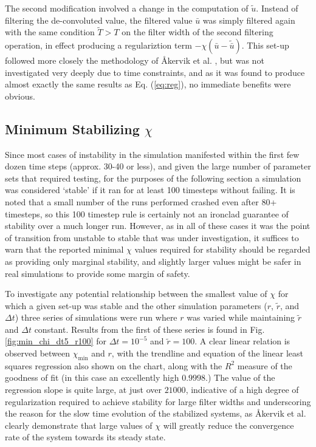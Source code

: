 The second modification involved a change in the computation of $\tilde{u}$. Instead of filtering the de-convoluted value, the filtered value $\bar{u}$ was simply filtered again with the same condition $\tilde{T}>T$ on the filter width of the second filtering operation, in effect producing a regulariztion term $-\chi(\bar{u}-\tilde{\bar{u}})$. This set-up followed more closely the methodology of \AA kervik et al. \cite{Akervik2006}, but was not investigated very deeply due to time constraints, and as it was found to produce almost exactly the same results as Eq. (\ref{eq:reg}), no immediate benefits were obvious.

\subsection{Minimum Stabilizing $\chi$}

Since most cases of instability in the simulation manifested within the first few dozen time steps (approx. 30-40 or less), and given the large number of parameter sets that required testing, for the purposes of the following section a simulation was considered `stable' if it ran for at least 100 timesteps without failing. It is noted that a small number of the runs performed crashed even after 80+ timesteps, so this 100 timestep rule is certainly not an ironclad guarantee of stability over a much longer run. However, as in all of these cases it was the point of transition from unstable to stable that was under investigation, it suffices to warn that the reported minimal $\chi$ values required for stability should be regarded as providing only marginal stability, and slightly larger values might be safer in real simulations to provide some margin of safety.

To investigate any potential relationship between the smallest value of $\chi$ for which a given set-up was stable and the other simulation parameters ($r$, $\tilde{r}$, and $\Delta t$) three series of simulations were run where $r$ was varied while maintaining $\tilde{r}$ and $\Delta t$ constant. Results from the first of these series is found in Fig. \ref{fig:min_chi_dt5_r100} for $\Delta t=10^{-5}$ and $\tilde{r}=100$. A clear linear relation is observed between $\chi_{\mathrm{min}}$ and $r$, with the trendline and equation of the linear least squares regression also shown on the chart, along with the $R^2$ measure of the goodness of fit (in this case an excellently high $0.9998$.) The value of the regression slope is quite large, at just over $21000$, indicative of a high degree of regularization required to achieve stability for large filter widths and underscoring the reason for the slow time evolution of the stabilized systems, as \AA kervik et al. \cite{Akervik2006} clearly demonstrate that large values of $\chi$ will greatly reduce the convergence rate of the system towards its steady state.

